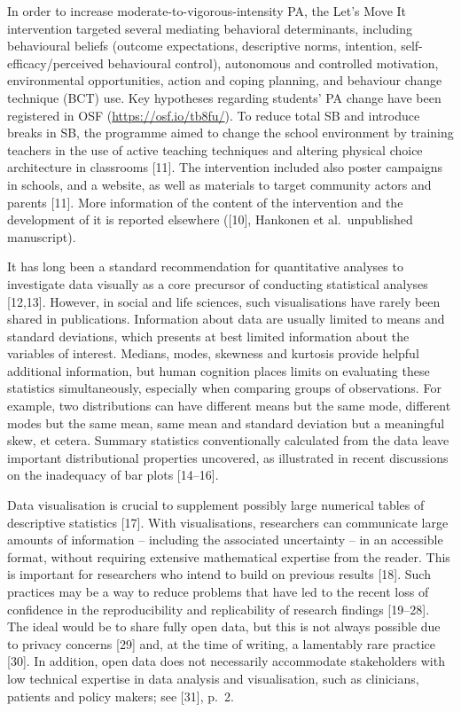 \documentclass[english,man,floatsintext]{apa6}
\begin{document}
In order to increase moderate-to-vigorous-intensity PA, the Let's Move It intervention targeted several mediating behavioral determinants, including behavioural beliefs (outcome expectations, descriptive norms, intention, self-efficacy/perceived behavioural control), autonomous and controlled motivation, environmental opportunities, action and coping planning, and behaviour change technique (BCT) use. Key hypotheses regarding students' PA change have been registered in OSF (\url{https://osf.io/tb8fu/}). To reduce total SB and introduce breaks in SB, the programme aimed to change the school environment by training teachers in the use of active teaching techniques and altering physical choice architecture in classrooms {[}11{]}. The intervention included also poster campaigns in schools, and a website, as well as materials to target community actors and parents {[}11{]}. More information of the content of the intervention and the development of it is reported elsewhere ({[}10{]}, Hankonen et al.~unpublished manuscript).

It has long been a standard recommendation for quantitative analyses to investigate data visually as a core precursor of conducting statistical analyses {[}12,13{]}. However, in social and life sciences, such visualisations have rarely been shared in publications. Information about data are usually limited to means and standard deviations, which presents at best limited information about the variables of interest. Medians, modes, skewness and kurtosis provide helpful additional information, but human cognition places limits on evaluating these statistics simultaneously, especially when comparing groups of observations. For example, two distributions can have different means but the same mode, different modes but the same mean, same mean and standard deviation but a meaningful skew, et cetera. Summary statistics conventionally calculated from the data leave important distributional properties uncovered, as illustrated in recent discussions on the inadequacy of bar plots {[}14--16{]}.

Data visualisation is crucial to supplement possibly large numerical tables of descriptive statistics {[}17{]}. With visualisations, researchers can communicate large amounts of information -- including the associated uncertainty -- in an accessible format, without requiring extensive mathematical expertise from the reader. This is important for researchers who intend to build on previous results {[}18{]}. Such practices may be a way to reduce problems that have led to the recent loss of confidence in the reproducibility and replicability of research findings {[}19--28{]}. The ideal would be to share fully open data, but this is not always possible due to privacy concerns {[}29{]} and, at the time of writing, a lamentably rare practice {[}30{]}. In addition, open data does not necessarily accommodate stakeholders with low technical expertise in data analysis and visualisation, such as clinicians, patients and policy makers; see {[}31{]}, p.~2.
\end{document}
